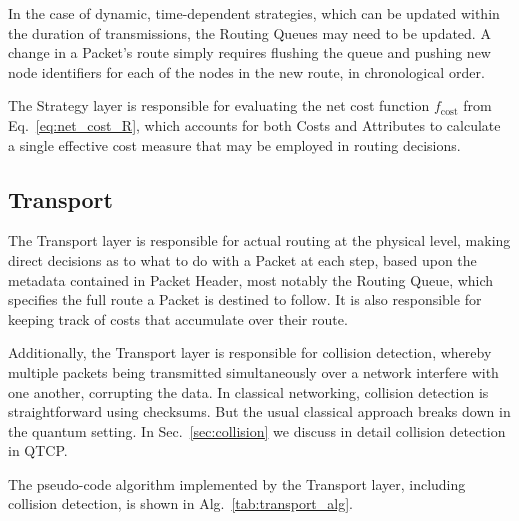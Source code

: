 \documentclass[aps,rmp,twocolumn,amsmath,amssymb,nofootinbib,superscriptaddress,longbibliography,floatfix]{revtex4-1}
\begin{document}
In the case of dynamic, time-dependent strategies, which can be updated within the duration of transmissions, the {\sc Routing Queues} may need to be updated. A change in a {\sc Packet's} route simply requires flushing the queue and pushing new node identifiers for each of the nodes in the new route, in chronological order.

The {\sc Strategy} layer is responsible for evaluating the net cost function $f_\mathrm{cost}$ from Eq.~\ref{eq:net_cost_R}, which accounts for both {\sc Costs} and {\sc Attributes} to calculate a single effective cost measure that may be employed in routing decisions.

%
%

\subsection{Transport} \label{sec:transport}

The {\sc Transport} layer is responsible for actual routing at the physical level, making direct decisions as to what to do with a {\sc Packet} at each step, based upon the metadata contained in {\sc Packet Header}, most notably the {\sc Routing Queue}, which specifies the full route a {\sc Packet} is destined to follow. It is also responsible for keeping track of costs that accumulate over their route.

Additionally, the {\sc Transport} layer is responsible for collision detection, whereby multiple packets being transmitted simultaneously over a network interfere with one another, corrupting the data. In classical networking, collision detection is straightforward using checksums. But the usual classical approach breaks down in the quantum setting. In Sec.~\ref{sec:collision} we discuss in detail collision detection in QTCP.

The pseudo-code algorithm implemented by the {\sc Transport} layer, including collision detection, is shown in Alg.~\ref{tab:transport_alg}.
\end{document}
